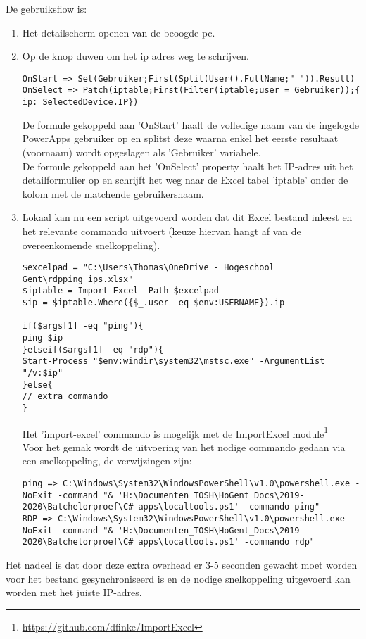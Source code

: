 De gebruiksflow is:
\begin{enumerate}
    \item Het detailscherm openen van de beoogde pc.
    \item Op de knop duwen om het ip adres weg te schrijven.
\begin{lstlisting}
OnStart => Set(Gebruiker;First(Split(User().FullName;" ")).Result)
OnSelect => Patch(iptable;First(Filter(iptable;user = Gebruiker));{ ip: SelectedDevice.IP})
\end{lstlisting}
    De formule gekoppeld aan 'OnStart' haalt de volledige naam van de ingelogde PowerApps gebruiker op en splitst deze waarna enkel het eerste resultaat (voornaam) wordt opgeslagen als 'Gebruiker' variabele.\\
    De formule gekoppeld aan het 'OnSelect' property haalt het IP-adres uit het detailformulier op en schrijft het weg naar de Excel tabel 'iptable' onder de kolom met de matchende gebruikersnaam.
    \item Lokaal kan nu een script uitgevoerd worden dat dit Excel bestand inleest en het relevante commando uitvoert (keuze hiervan hangt af van de overeenkomende snelkoppeling).
\begin{lstlisting}[style=powershellStyle]
$excelpad = "C:\Users\Thomas\OneDrive - Hogeschool Gent\rdpping_ips.xlsx"
$iptable = Import-Excel -Path $excelpad
$ip = $iptable.Where({$_.user -eq $env:USERNAME}).ip

if($args[1] -eq "ping"){
ping $ip
}elseif($args[1] -eq "rdp"){
Start-Process "$env:windir\system32\mstsc.exe" -ArgumentList "/v:$ip"
}else{
// extra commando
}
\end{lstlisting}
    Het 'import-excel' commando is mogelijk met de ImportExcel module\footnote{\url{https://github.com/dfinke/ImportExcel}}\\
    Voor het gemak wordt de uitvoering van het nodige commando gedaan via een snelkoppeling, de verwijzingen zijn:
\begin{lstlisting}
ping => C:\Windows\System32\WindowsPowerShell\v1.0\powershell.exe -NoExit -command "& 'H:\Documenten_TOSH\HoGent_Docs\2019-2020\Batchelorproef\C# apps\localtools.ps1' -commando ping"
RDP => C:\Windows\System32\WindowsPowerShell\v1.0\powershell.exe -NoExit -command "& 'H:\Documenten_TOSH\HoGent_Docs\2019-2020\Batchelorproef\C# apps\localtools.ps1' -commando rdp"
\end{lstlisting}
\end{enumerate}

Het nadeel is dat door deze extra overhead er 3-5 seconden gewacht moet worden voor het bestand gesynchroniseerd is en de nodige snelkoppeling uitgevoerd kan worden met het juiste IP-adres.

